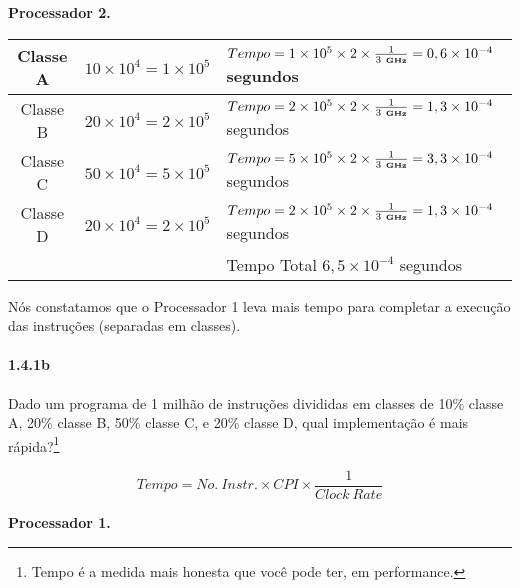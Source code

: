 \documentclass{article}
\begin{document}
\textbf{Processador 2.}

\begin{tabular}{|c|l|l|}
\hline Classe A & $10 \times 10^{4} = 1 \times 10^{5}$ &

$Tempo = 1 \times 10^{5} \times 2 \times \frac{1}{3\ \textbf{\tiny GHz}} = 
0,6 \times 10^{-4}$ segundos \\

\hline Classe B & $20 \times 10^{4} = 2 \times 10^{5}$ &

$Tempo = 2 \times 10^{5} \times 2 \times \frac{1}{3\ \textbf{\tiny GHz}} = 
1,3 \times 10^{-4}$ segundos \\

\hline Classe C & $50 \times 10^{4} = 5 \times 10^{5}$ &

$Tempo = 5 \times 10^{5} \times 2 \times \frac{1}{3\ \textbf{\tiny GHz}} = 
3,3 \times 10^{-4}$ segundos \\

\hline Classe D & $20 \times 10^{4} = 2 \times 10^{5}$ &

$Tempo = 2 \times 10^{5} \times 2 \times \frac{1}{3\ \textbf{\tiny GHz}} = 
1,3 \times 10^{-4}$ segundos \\

\hline & & Tempo Total $6,5 \times 10^{-4}$ segundos \\

\hline
\end{tabular}

Nós constatamos que o Processador 1 leva mais tempo para completar a execução 
das instruções (separadas em classes).

\clearpage
\paragraph{1.4.1b} Dado um programa de 1 milhão de instruções divididas em 
classes de 10\% classe A, 20\% classe B, 50\% classe C, e 20\% classe D, qual 
implementação é mais rápida?\footnote{Tempo é a medida mais honesta que você 
pode ter, em performance.}

$$Tempo = No.\ Instr. \times CPI \times \frac{1}{Clock\ Rate}$$

\textbf{Processador 1.}
\end{document}

